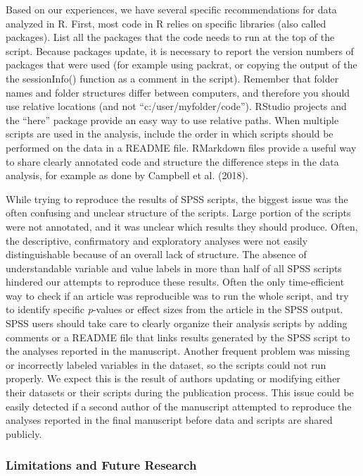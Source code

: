 \documentclass[,jou, a4paper,floatsintext]{apa6}
\begin{document}
Based on our experiences, we have several specific recommendations for data analyzed in R. First, most code in R relies on specific libraries (also called packages). List all the packages that the code needs to run at the top of the script. Because packages update, it is necessary to report the version numbers of packages that were used (for example using packrat, or copying the output of the the sessionInfo() function as a comment in the script). Remember that folder names and folder structures differ between computers, and therefore you should use relative locations (and not \enquote{c:/user/myfolder/code}). RStudio projects and the \enquote{here} package provide an easy way to use relative paths. When multiple scripts are used in the analysis, include the order in which scripts should be performed on the data in a README file. RMarkdown files provide a useful way to share clearly annotated code and structure the difference steps in the data analysis, for example as done by Campbell et al. (2018).

While trying to reproduce the results of SPSS scripts, the biggest issue was the often confusing and unclear structure of the scripts. Large portion of the scripts were not annotated, and it was unclear which results they should produce. Often, the descriptive, confirmatory and exploratory analyses were not easily distinguishable because of an overall lack of structure. The absence of understandable variable and value labels in more than half of all SPSS scripts hindered our attempts to reproduce these results. Often the only time-efficient way to check if an article was reproducible was to run the whole script, and try to identify specific \emph{p}-values or effect sizes from the article in the SPSS output. SPSS users should take care to clearly organize their analysis scripts by adding comments or a README file that links results generated by the SPSS script to the analyses reported in the manuscript. Another frequent problem was missing or incorrectly labeled variables in the dataset, so the scripts could not run properly. We expect this is the result of authors updating or modifying either their datasets or their scripts during the publication process. This issue could be easily detected if a second author of the manuscript attempted to reproduce the analyses reported in the final manuscript before data and scripts are shared publicly.

\hypertarget{limitations-and-future-research}{%
\subsubsection{Limitations and Future Research}\label{limitations-and-future-research}}
\end{document}
